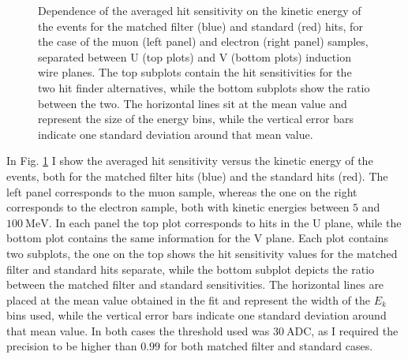 \begin{figure}[t]
\begin{subfigure}{0.5\textwidth}
	\end{subfigure}
	\caption[Dependence of the averaged hit sensitivity on the kinetic energy of the events for the matched filter and standard hits, for the case of the muon and electron samples.]{Dependence of the averaged hit sensitivity on the kinetic energy of the events for the matched filter (blue) and standard (red) hits, for the case of the muon (left panel) and electron (right panel) samples, separated between U (top plots) and V (bottom plots) induction wire planes. The top subplots contain the hit sensitivities for the two hit finder alternatives, while the bottom subplots show the ratio between the two. The horizontal lines sit at the mean value and represent the size of the energy bins, while the vertical error bars indicate one standard deviation around that mean value.}
	\label{fig:sensitivity_energy}
\end{figure}

In Fig. \ref{fig:sensitivity_energy} I show the averaged hit sensitivity versus the kinetic energy of the events, both for the matched filter hits (blue) and the standard hits (red). The left panel corresponds to the muon sample, whereas the one on the right corresponds to the electron sample, both with kinetic energies between $5$ and $100 \ \mathrm{MeV}$. In each panel the top plot corresponds to hits in the U plane, while the bottom plot contains the same information for the V plane. Each plot contains two subplots, the one on the top shows the hit sensitivity values for the matched filter and standard hits separate, while the bottom subplot depicts the ratio between the matched filter and standard sensitivities. The horizontal lines are placed at the mean value obtained in the fit and represent the width of the $E_{k}$ bins used, while the vertical error bars indicate one standard deviation around that mean value. In both cases the threshold used was $30 \ \mathrm{ADC}$, as I required the precision to be higher than $0.99$ for both matched filter and standard cases.

